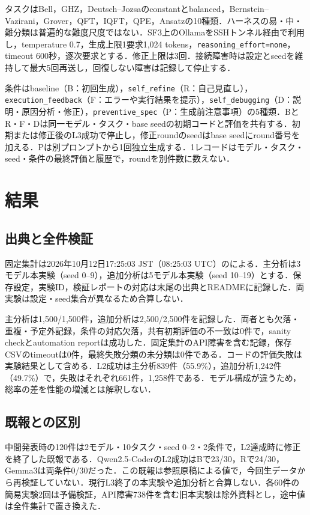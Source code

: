 \documentclass[a4paper,8pt,twocolumn]{extarticle}
\begin{document}
タスクはBell，GHZ，Deutsch--Jozsaのconstantとbalanced，Bernstein--Vazirani，Grover，QFT，IQFT，QPE，Ansatzの10種類．ハーネスの易・中・難分類は普遍的な難度尺度ではない．SF3上のOllamaをSSHトンネル経由で利用し，temperature 0.7，生成上限1要求1,024 tokens，\texttt{reasoning\_effort=none}，timeout 600秒，逐次要求とする．修正上限は3回．接続障害時は設定とseedを維持して最大5回再送し，回復しない障害は記録して停止する．

条件はbaseline（B：初回生成），\texttt{self\_refine}（R：自己見直し），\texttt{execution\_feedback}（F：エラーや実行結果を提示），\texttt{self\_debugging}（D：説明・原因分析・修正），\texttt{preventive\_spec}（P：生成前注意事項）の5種類．BとR・F・Dは同一モデル・タスク・base seedの初期コードと評価を共有する．初期または修正後のL3成功で停止し，修正roundのseedはbase seedにround番号を加える．Pは別プロンプトから1回独立生成する．1レコードはモデル・タスク・seed・条件の最終評価と履歴で，roundを別件数に数えない．
\section{結果}
\subsection{出典と全件検証}
固定集計は2026年10月12日17:25:03 JST（08:25:03 UTC）のによる．主分析は3モデル本実験（seed 0--9），追加分析は5モデル本実験（seed 10--19）とする．保存設定，実験ID，検証レポートの対応は末尾の出典\cite{data}とREADMEに記録した．両実験は設定・seed集合が異なるため合算しない．

主分析は1,500/1,500件，追加分析は2,500/2,500件を記録した．両者とも欠落・重複・予定外記録，条件の対応欠落，共有初期評価の不一致は0件で，sanity checkとautomation reportは成功した．固定集計のAPI障害を含む記録，保存CSVのtimeoutは0件，最終失敗分類の未分類は0件である．コードの評価失敗は実験結果として含める．L2成功は主分析839件（55.9\%），追加分析1,242件（49.7\%）で，失敗はそれぞれ661件，1,258件である．モデル構成が違うため，総率の差を性能の増減とは解釈しない．

\subsection{既報との区別}
中間発表時の120件は2モデル・10タスク・seed 0--2・2条件で，L2達成時に修正を終了した既報である．Qwen2.5-CoderのL2成功はBで23/30，Rで24/30，Gemma3は両条件0/30だった．この既報は参照原稿による値で，今回生データから再検証していない．現行L3終了の本実験や追加分析と合算しない．各60件の簡易実験2回は予備検証，API障害738件を含む旧本実験は除外資料とし，途中値は全件集計で置き換えた．
\end{document}
